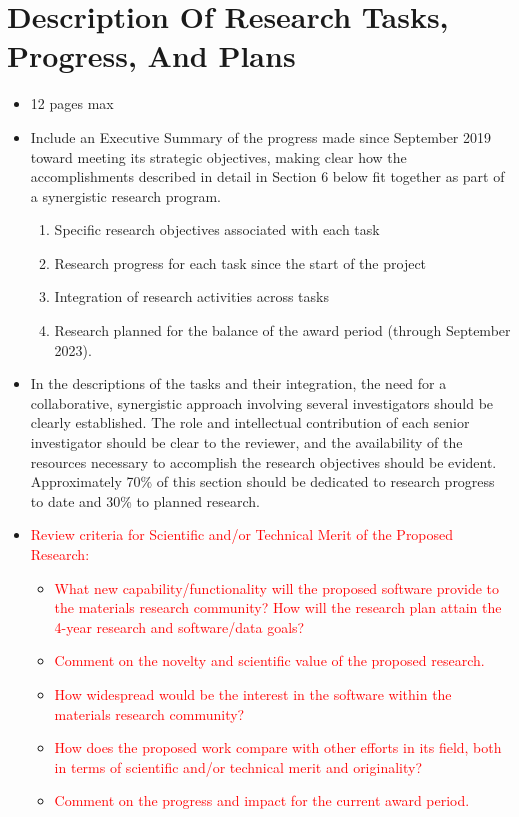 \section{Description Of Research Tasks, Progress, And Plans}
\label{sec:research}

{\small\color{red}
\begin{itemize}
\item 12 pages max
    \item Include an Executive Summary of the progress made since September 2019 toward
meeting its strategic objectives, making clear how the accomplishments described in detail in Section 6 below fit together as part of a synergistic research program.
\begin{enumerate}
    \item Specific research objectives associated with each task
    \item Research progress for each task since the start of the project
    \item Integration of research activities across tasks
    \item Research planned for the balance of the award period (through September 2023).
\end{enumerate}
\item In the descriptions of the tasks and their integration, the need for a collaborative, synergistic approach involving several investigators should be clearly established. The role and intellectual contribution of each senior investigator should be clear to the reviewer, and the availability of the resources necessary to accomplish the research objectives should be evident. Approximately 70\% of this section should be dedicated to research progress to date and 30\% to planned research.
    \item \textcolor{red}{Review criteria for Scientific and/or Technical Merit of the Proposed Research:}
    \begin{itemize}
        \item \textcolor{red}{What new capability/functionality will the proposed software provide to the materials research community? How will the research plan attain the 4-year research and software/data goals?}
        \item \textcolor{red}{Comment on the novelty and scientific value of the proposed research. }
        \item \textcolor{red}{How widespread would be the interest in the software within the materials research community?}
        \item \textcolor{red}{How does the proposed work compare with other efforts in its field, both in terms of scientific and/or technical merit and originality?}
        \item \textcolor{red}{Comment on the progress and impact for the current award period.}
    \end{itemize}

\end{itemize}
}
